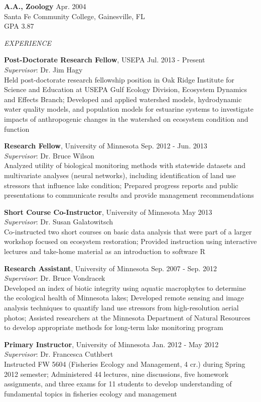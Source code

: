 \documentclass[letterpaper,12pt]{article}
\newcommand{\sectitle}[1]{\vspace{\baselineskip} \centerline{\large{\textit{#1}}}}
\begin{document}
{\bf A.A., Zoology} \hfill Apr. 2004 \\
Santa Fe Community College, Gainesville, FL \\
GPA 3.87

\sectitle{EXPERIENCE}

{\bf Post-Doctorate Research Fellow}, USEPA \hfill Jul. 2013 - Present\\
\textit{Supervisor}: Dr. Jim Hagy \\
Held post-doctorate research fellowship position in Oak Ridge Institute for Science and Education at USEPA Gulf Ecology Division, Ecosystem Dynamics and Effects Branch; Developed and applied watershed models, hydrodynamic water quality models, and population models for estuarine systems to investigate impacts of anthropogenic changes in the watershed on ecosystem condition and function 

{\bf Research Fellow}, University of Minnesota \hfill Sep. 2012 - Jun. 2013\\
\textit{Supervisor}: Dr. Bruce Wilson \\
Analyzed utility of biological monitoring methods with statewide datasets and multivariate analyses (neural networks), including identification of land use stressors that influence lake condition; Prepared progress reports and public presentations to communicate results and provide management recommendations

{\bf Short Course Co-Instructor}, University of Minnesota \hfill May 2013\\
\textit{Supervisor}: Dr. Susan Galatowitsch \\
Co-instructed two short courses on basic data analysis that were part of a larger workshop focused on ecosystem restoration; Provided instruction using interactive lectures and take-home material as an introduction to software R

{\bf Research Assistant}, University of Minnesota \hfill Sep. 2007 - Sep. 2012\\
\textit{Supervisor}: Dr. Bruce Vondracek \\
Developed an index of biotic integrity using aquatic macrophytes to determine the ecological health of Minnesota lakes; Developed remote sensing and image analysis techniques to quantify land use stressors from high-resolution aerial photos; Assisted researchers at the Minnesota Department of Natural Resources to develop appropriate methods for long-term lake monitoring program

{\bf Primary Instructor}, University of Minnesota \hfill Jan. 2012 - May 2012 \\
\textit{Supervisor}: Dr. Francesca Cuthbert \\
Instructed FW 5604 (Fisheries Ecology and Management, 4 cr.) during Spring 2012 semester; Administered 44 lectures, nine discussions, five homework assignments, and three exams for 11 students to develop understanding of fundamental topics in fisheries ecology and management
\end{document}
